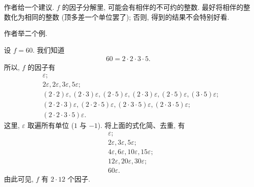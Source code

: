 作者给一个建议. $f$ 的因子分解里, 可能会有相伴的不可约的整数. 最好将相伴的整数化为相同的整数 (顶多差一个单位罢了); 否则, 得到的结果不会特别好看.

作者举二个例.

\begin{example}
    设 $f = 60$. 我们知道
    \begin{align*}
        60 = 2 \cdot 2 \cdot 3 \cdot 5.
    \end{align*}
    所以, $f$ 的因子有
    \begin{align*}
         & \varepsilon;                                                                                                                                    \\
         & 2\varepsilon, 2\varepsilon, 3\varepsilon, 5\varepsilon;                                                                                         \\
         & (2 \cdot 2)\varepsilon, (2 \cdot 3)\varepsilon, (2 \cdot 5)\varepsilon, (2 \cdot 3)\varepsilon, (2 \cdot 5)\varepsilon, (3 \cdot 5)\varepsilon; \\
         & (2 \cdot 2 \cdot 3)\varepsilon, (2 \cdot 2 \cdot 5)\varepsilon, (2 \cdot 3 \cdot 5)\varepsilon, (2 \cdot 3 \cdot 5)\varepsilon;                 \\
         & (2 \cdot 2 \cdot 3 \cdot 5)\varepsilon.
    \end{align*}
    这里, $\varepsilon$ 取遍所有单位 ($1$ 与 $-1$). 将上面的式化简、去重, 有
    \begin{align*}
         & \varepsilon;                                              \\
         & 2\varepsilon, 3\varepsilon, 5\varepsilon;                 \\
         & 4\varepsilon, 6\varepsilon, 10\varepsilon, 15\varepsilon; \\
         & 12\varepsilon, 20\varepsilon, 30\varepsilon;              \\
         & 60\varepsilon.
    \end{align*}
    由此可见, $f$ 有 $2 \cdot 12$ 个因子.


\end{example}
